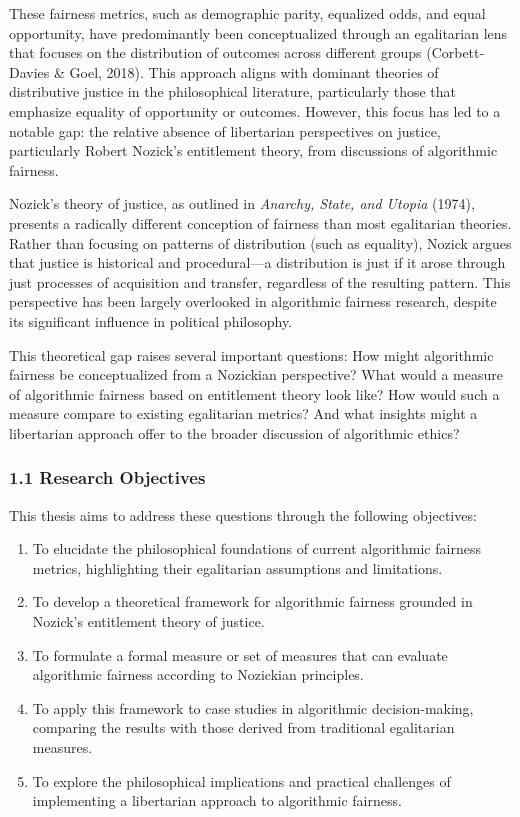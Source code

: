 These fairness metrics, such as demographic parity, equalized odds, and
equal opportunity, have predominantly been conceptualized through an
egalitarian lens that focuses on the distribution of outcomes across
different groups (Corbett-Davies \& Goel, 2018). This approach aligns
with dominant theories of distributive justice in the philosophical
literature, particularly those that emphasize equality of opportunity or
outcomes. However, this focus has led to a notable gap: the relative
absence of libertarian perspectives on justice, particularly Robert
Nozick's entitlement theory, from discussions of algorithmic fairness.

Nozick's theory of justice, as outlined in \emph{Anarchy, State, and
Utopia} (1974), presents a radically different conception of fairness
than most egalitarian theories. Rather than focusing on patterns of
distribution (such as equality), Nozick argues that justice is
historical and procedural---a distribution is just if it arose through
just processes of acquisition and transfer, regardless of the resulting
pattern. This perspective has been largely overlooked in algorithmic
fairness research, despite its significant influence in political
philosophy.

This theoretical gap raises several important questions: How might
algorithmic fairness be conceptualized from a Nozickian perspective?
What would a measure of algorithmic fairness based on entitlement theory
look like? How would such a measure compare to existing egalitarian
metrics? And what insights might a libertarian approach offer to the
broader discussion of algorithmic ethics?

\subsubsection{1.1 Research Objectives}\label{research-objectives}

This thesis aims to address these questions through the following
objectives:

\begin{enumerate}
\def\labelenumi{\arabic{enumi}.}
\item
  To elucidate the philosophical foundations of current algorithmic
  fairness metrics, highlighting their egalitarian assumptions and
  limitations.
\item
  To develop a theoretical framework for algorithmic fairness grounded
  in Nozick's entitlement theory of justice.
\item
  To formulate a formal measure or set of measures that can evaluate
  algorithmic fairness according to Nozickian principles.
\item
  To apply this framework to case studies in algorithmic
  decision-making, comparing the results with those derived from
  traditional egalitarian measures.
\item
  To explore the philosophical implications and practical challenges of
  implementing a libertarian approach to algorithmic fairness.
\end{enumerate}

